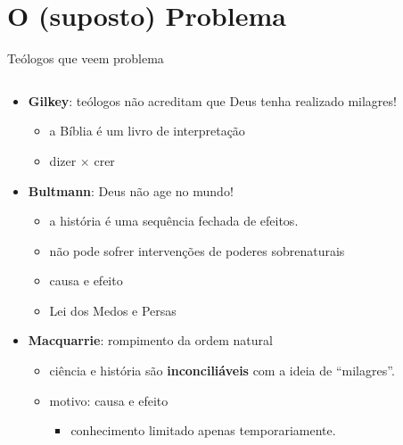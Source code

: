 \section{O (suposto) Problema}

\begin{frame}{Teólogos que veem problema}
 \begin{columns}
  \begin{column}{0.7\textwidth}
   \begin{itemize}
    \item<2->[$\bullet$] \textcolor{NordBrightCyan}{\textbf{Gilkey}}: teólogos não acreditam que Deus 
    tenha realizado milagres!
     \begin{itemize}
      \item<5-> a Bíblia é um livro de interpretação
      \item<6-> dizer $\times$ crer
     \end{itemize}
    \item<3->[$\bullet$] \textcolor{NordBrightCyan}{\textbf{Bultmann}}: Deus não age no mundo!
     \begin{itemize}
      \item<7-> a história é uma \textcolor{NordYellow}{sequência fechada de efeitos}.
      \item<8-> não pode sofrer intervenções de poderes sobrenaturais
      \item<9-> causa e efeito
      \item<10-> Lei dos Medos e Persas
     \end{itemize}
    \item<4->[$\bullet$] \textcolor{NordBrightCyan}{\textbf{Macquarrie}}: rompimento da ordem natural
     \begin{itemize}
      \item<11-> ciência e história são \textbf{\textcolor{NordRed}{inconciliáveis}}
      com a ideia de ``milagres''.
      \item<12-> motivo: causa e efeito
       \begin{itemize}
        \item<13->[-] conhecimento limitado apenas temporariamente.
       \end{itemize}
     \end{itemize}
   \end{itemize}
  \end{column}
  \begin{column}{0.3\textwidth}
  \end{column}
 \end{columns}
\end{frame}

